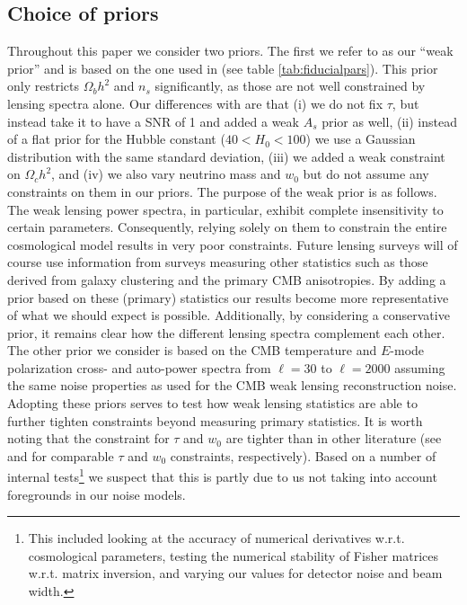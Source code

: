 \documentclass[11pt]{article} %
\begin{document}
\subsection{Choice of priors}
Throughout this paper we consider two priors. The first we refer to as our ``weak prior'' and is based on the one used in \cite{Planck2018Lensing} (see table \ref{tab:fiducialpars}). This prior only restricts $\Omega_b h^2$ and $n_s$ significantly, as those are not well constrained by lensing spectra alone. Our differences with \cite{Planck2018Lensing} are that (i) we do not fix $\tau$, but instead take it to have a SNR of 1 and added a weak $A_s$ prior as well, (ii) instead of a flat prior for the Hubble constant ($40 < H_0 < 100$) we use a Gaussian distribution with the same standard deviation, (iii) we added a weak constraint on $\Omega_c h^2$, and (iv) we also vary neutrino mass and $w_0$ but do not assume any constraints on them in our priors. The purpose of the weak prior is as follows. The weak lensing power spectra, in particular, exhibit complete insensitivity to certain parameters. Consequently, relying solely on them to constrain the entire cosmological model results in very poor constraints. Future lensing surveys will of course use information from surveys measuring other statistics such as those derived from galaxy clustering and the primary CMB anisotropies. By adding a prior based on these (primary) statistics our results become more representative of what we should expect is possible. Additionally, by considering a conservative prior, it remains clear how the different lensing spectra complement each other. The other prior we consider is based on the CMB temperature and $E$-mode polarization cross- and auto-power spectra from $\ell=30$ to $\ell = 2000$ assuming the same noise properties as used for the CMB weak lensing reconstruction noise. Adopting these priors  serves to test how weak lensing statistics are able to further tighten constraints beyond measuring primary statistics. It is worth noting that the constraint for $\tau$ and $w_0$ are tighter than in other literature (see \cite{cmbs4sciencebook} and \cite{Namikawa_2016} for comparable $\tau$ and $w_0$ constraints, respectively). Based on a number of internal tests\footnote{
This included looking at the accuracy of numerical derivatives w.r.t. cosmological parameters, testing the numerical stability of Fisher matrices w.r.t. matrix inversion, and varying our values for detector noise and beam width.
} we suspect that this is partly due to us not taking into account foregrounds in our noise models.
\end{document}
